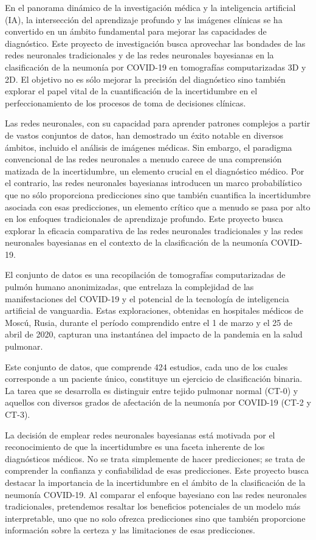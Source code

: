 \documentclass[10pt, oneside, a4paper]{article}
\begin{document}
	En el panorama dinámico de la investigación médica y la inteligencia artificial (IA), la intersección del aprendizaje profundo y las imágenes clínicas se ha convertido en un ámbito fundamental para mejorar las capacidades de diagnóstico. Este proyecto de investigación busca aprovechar las bondades de las redes neuronales tradicionales y de las redes neuronales bayesianas en la clasificación de la neumonía por COVID-19 en tomografías computarizadas 3D y 2D. El objetivo no es sólo mejorar la precisión del diagnóstico sino también explorar el papel vital de la cuantificación de la incertidumbre en el perfeccionamiento de los procesos de toma de decisiones clínicas.
	
	Las redes neuronales, con su capacidad para aprender patrones complejos a partir de vastos conjuntos de datos, han demostrado un éxito notable en diversos ámbitos, incluido el análisis de imágenes médicas. Sin embargo, el paradigma convencional de las redes neuronales a menudo carece de una comprensión matizada de la incertidumbre, un elemento crucial en el diagnóstico médico. Por el contrario, las redes neuronales bayesianas introducen un marco probabilístico que no sólo proporciona predicciones sino que también cuantifica la incertidumbre asociada con esas predicciones, un elemento crítico que a menudo se pasa por alto en los enfoques tradicionales de aprendizaje profundo. Este proyecto busca explorar la eficacia comparativa de las redes neuronales tradicionales y las redes neuronales bayesianas en el contexto de la clasificación de la neumonía COVID-19.
	
	El conjunto de datos es una recopilación de tomografías computarizadas de pulmón humano anonimizadas, que entrelaza la complejidad de las manifestaciones del COVID-19 y el potencial de la tecnología de inteligencia artificial de vanguardia. Estas exploraciones, obtenidas en hospitales médicos de Moscú, Rusia, durante el período comprendido entre el 1 de marzo y el 25 de abril de 2020, capturan una instantánea del impacto de la pandemia en la salud pulmonar. 
	
	Este conjunto de datos, que comprende 424 estudios, cada uno de los cuales corresponde a un paciente único, constituye un ejercicio de clasificación binaria. La tarea que se desarrolla es distinguir entre tejido pulmonar normal (CT-0) y aquellos con diversos grados de afectación de la neumonía por COVID-19 (CT-2 y CT-3). 
	
	La decisión de emplear redes neuronales bayesianas está motivada por el reconocimiento de que la incertidumbre es una faceta inherente de los diagnósticos médicos. No se trata simplemente de hacer predicciones; se trata de comprender la confianza y confiabilidad de esas predicciones. Este proyecto busca destacar la importancia de la incertidumbre en el ámbito de la clasificación de la neumonía COVID-19. Al comparar el enfoque bayesiano con las redes neuronales tradicionales, pretendemos resaltar los beneficios potenciales de un modelo más interpretable, uno que no solo ofrezca predicciones sino que también proporcione información sobre la certeza y las limitaciones de esas predicciones.
	
\end{document}
